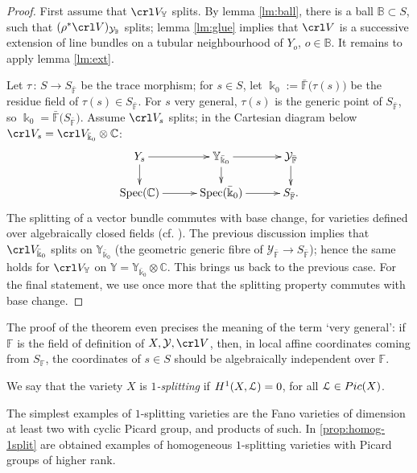\documentclass[11pt,reqno]{amsart}
\let\euf\EuScript
\let\cal\mathcal
\let\mbb\mathbb
\numberwithin{equation}{section}
\numberwithin{figure}{section}
\begin{document}
\begin{proof} 
First assume that $\crl V_{\mbb Y}$ splits. By lemma \ref{lm:ball}, there is a ball 
${{\mbb B}}\subset S$, such that $(\rho^*\crl V)_{{{\cal Y}}_{{\mbb B}}}$ splits; lemma \ref{lm:glue} 
implies that $\crl V$ is a successive extension of line bundles on a tubular neighbourhood 
of $Y_o$, $o\in{{\mbb B}}$. It remains to apply lemma \ref{lm:ext}. 

Let $\tau\,{:}\,S\to S_{\bar{{\mbb F}}}$ be the trace morphism; for $s\in S$, let 
$\Bbbk_0:=\bar{{\mbb F}}\big(\tau(s)\big)$ be the residue field of $\tau(s)\in S_{\bar{{\mbb F}}}$. 
For $s$ very general, $\tau(s)$ is the generic point of $S_{\bar{{\mbb F}}}$, 
so $\Bbbk_0=\bar{{\mbb F}}\big( S_{\bar{{\mbb F}}}\big)$. 
Assume $\crl V_s$ splits; in the Cartesian diagram below 
$\crl V_{s}=\crl V_{\bar{\Bbbk}_0}\otimes{{\mbb C}}$: 
$$
\xymatrix@R=1.5em@C=3em{
Y_s\ar[r]\ar[d]
&
{{\mbb Y}}_{\bar{\Bbbk}_0}
\ar[d]\ar[r]
&
{{\cal Y}}_{\bar{{\mbb F}}}\ar[d]
\\  
{\mathop{\rm Spec}\nolimits}({{\mbb C}})\ar[r]
&
{\mathop{\rm Spec}\nolimits}(\bar\Bbbk_0)\ar[r]
&
S_{\bar{{\mbb F}}}.
}
$$ 
The splitting of a vector bundle commutes with base change, for varieties defined over 
algebraically closed fields (cf. \cite{hal}). The previous discussion implies that 
$\crl V_{\bar{\Bbbk}_0}$ splits on ${{\mbb Y}}_{\bar{\Bbbk}_0}$ (the geometric generic 
fibre of ${{\cal Y}}_{\bar{{\mbb F}}}\to S_{\bar{{\mbb F}}}$); hence the same holds for 
$\crl V_{{\mbb Y}}$ on ${{\mbb Y}}={{\mbb Y}}_{\bar\Bbbk_0}\otimes{{\mbb C}}$. 
This brings us back to the previous case. For the final statement, 
we use once more that the splitting property commutes with base change. 
\end{proof}

The proof of the theorem even precises the meaning of the term `very general': 
if ${{\mbb F}}$ is the field of definition of $X,{{\cal Y}},\crl V$, then, in local affine coordinates 
coming from $S_{{\mbb F}}$, the coordinates of $s\in S$ should be algebraically independent 
over ${{\mbb F}}$. 

\begin{m-definition}\label{def:1split}
We say that the variety $X$ is \emph{$1$-splitting} if $H^1(X,{{\euf L}})=0$, 
for all ${{\euf L}}\in Pic(X)$. 
\end{m-definition}
The simplest examples of $1$-splitting varieties are the Fano varieties of dimension at 
least two with cyclic Picard group, and products of such. 
In \ref{prop:homog-1split} are obtained examples of homogeneous $1$-splitting varieties 
with Picard groups of higher rank.
\end{document}
